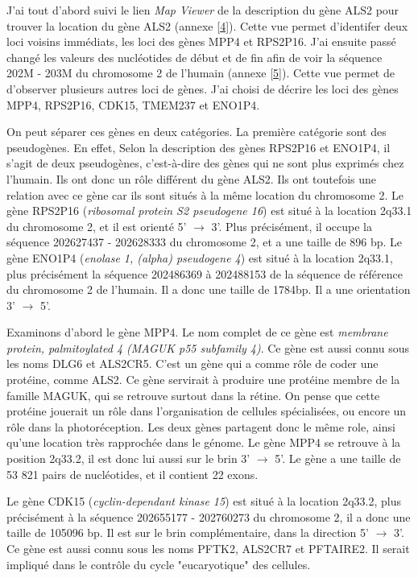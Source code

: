 \documentclass[11pt]{article} %
\begin{document}
J'ai tout d'abord suivi le lien \emph{Map Viewer} de la description du gène ALS2 pour trouver la location 
du gène ALS2 (annexe \ref{4}).  Cette vue permet d'identifer deux loci voisins immédiats, les loci des gènes 
MPP4 et RPS2P16. J'ai ensuite passé changé les valeurs des nucléotides de début et de fin afin de voir la
séquence 202M - 203M du chromosome 2 de l'humain (annexe \ref{5}). Cette vue permet de d'observer plusieurs autres
loci de gènes. J'ai choisi de décrire les loci des gènes MPP4, RPS2P16, CDK15, TMEM237 et ENO1P4.

On peut séparer ces gènes en deux catégories. La première catégorie sont des pseudogènes. En effet,
Selon la description des gènes RPS2P16 et ENO1P4, il s'agit de deux pseudogènes, c'est-à-dire des
gènes qui ne sont plus exprimés chez l'humain. Ils ont donc un rôle différent du gène ALS2. Ils ont toutefois
une relation avec ce gène car ils sont situés à la même location du chromosome 2. Le gène RPS2P16 
(\emph{ribosomal protein S2 pseudogene 16}) est situé à la location 2q33.1 du chromosome 2, et il 
est orienté 5' $\rightarrow$ 3'. Plus précisément, il occupe la séquence 202627437 - 202628333 du 
chromosome 2, et a une taille de 896 bp. Le gène ENO1P4 (\emph{enolase 1, (alpha) pseudogene 4})
est situé  à la location 2q33.1, plus précisément la séquence 202486369 à 202488153 de la séquence de référence
du chromosome 2 de l'humain. Il a donc une taille de 1784bp. Il a une orientation 3' $\rightarrow$ 5'. 

Examinons d'abord le gène MPP4. Le nom complet de ce gène est \emph{membrane protein, palmitoylated 4 (MAGUK p55 subfamily 4)}. 
Ce gène est aussi connu sous les noms DLG6 et ALS2CR5. C'est un gène qui a comme rôle de coder une protéine, comme ALS2. 
Ce gène servirait à produire une protéine membre de la famille MAGUK, qui se retrouve surtout dans la rétine. On pense que 
cette protéine jouerait un rôle dans l'organisation de cellules spécialisées, ou encore un rôle dans la photoréception. 
Les deux gènes partagent donc le même role, ainsi qu'une location très rapprochée dans le génome. Le gène MPP4 se retrouve 
à la position 2q33.2, il est donc lui aussi sur le brin 3' $\rightarrow$ 5'. Le gène a une taille de 53 821 pairs de 
nucléotides, et il contient 22 exons. 

Le gène CDK15 (\emph{cyclin-dependant kinase 15}) est situé à la location 2q33.2, plus précisément
à la séquence 202655177 - 202760273 du chromosome 2, il a donc une taille de 105096 bp. Il est sur le brin
complémentaire, dans la direction 5' $\rightarrow$ 3'. Ce gène est aussi connu sous les noms 
PFTK2, ALS2CR7 et PFTAIRE2. Il serait impliqué dans le contrôle du cycle "eucaryotique" 
des cellules.
\end{document}
